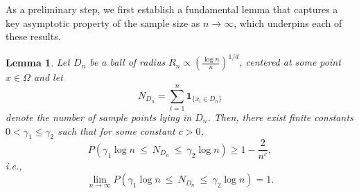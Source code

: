 \documentclass{article}
\newtheorem{lemma}{Lemma}
\begin{document}
As a preliminary step, we first establish a fundamental lemma that captures a key asymptotic property of the sample size as $n\rightarrow\infty$, which underpins each of these results.

\begin{lemma}
Let $D_n$ be a ball of radius $R_n \propto \left(\frac{\log n}{n}\right)^{1/d}$, centered at some point $x\in \Omega$ and let 
$$ 
N_{D_n} = \sum_{i=1}^n \mathbf{1}_{\{x_i \in D_n\}}$$
denote the number of sample points lying in $D_n$. Then, there exist finite constants $0 < \gamma_1 \leq \gamma_2$ such that for some constant $c>0$,
$$ P\left( \gamma_1 \log n \ \leq\ N_{D_n} \ \leq\ \gamma_2 \log n \right) \geq 1-\frac{2}{n^c},
$$
i.e.,
\[
\lim_{n \to \infty} P\left( \gamma_1 \log n \ \leq\ N_{D_n} \ \leq\ \gamma_2 \log n \right) = 1.
\]
    \label{convergence rate of sample size growth}
\end{lemma}
\end{document}
